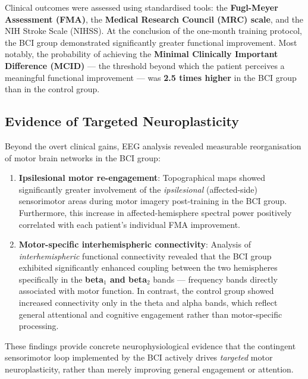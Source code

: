 \documentclass[10pt, letterpaper]{report}
\begin{document}
Clinical outcomes were assessed using standardised tools: the \textbf{Fugl-Meyer
Assessment (FMA)}, the \textbf{Medical Research Council (MRC) scale}, and the NIH
Stroke Scale (NIHSS). At the conclusion of the one-month training protocol, the BCI group
demonstrated significantly greater functional improvement. Most notably, the probability of
achieving the \textbf{Minimal Clinically Important Difference (MCID)} — the threshold
beyond which the patient perceives a meaningful functional improvement — was
\textbf{2.5 times higher} in the BCI group than in the control group.

\subsection{Evidence of Targeted Neuroplasticity}

Beyond the overt clinical gains, EEG analysis revealed measurable reorganisation of
motor brain networks in the BCI group:

\begin{enumerate}
  \item \textbf{Ipsilesional motor re-engagement}: Topographical maps showed
  significantly greater involvement of the \emph{ipsilesional} (affected-side)
  sensorimotor areas during motor imagery post-training in the BCI group. Furthermore,
  this increase in affected-hemisphere spectral power positively correlated with each
  patient's individual FMA improvement.

  \item \textbf{Motor-specific interhemispheric connectivity}: Analysis of
  \emph{interhemispheric} functional connectivity revealed that the BCI group exhibited
  significantly enhanced coupling between the two hemispheres specifically in the
  \textbf{beta$_1$ and beta$_2$} bands — frequency bands directly associated with motor
  function. In contrast, the control group showed increased connectivity only in the
  theta and alpha bands, which reflect general attentional and cognitive engagement rather
  than motor-specific processing.
\end{enumerate}

These findings provide concrete neurophysiological evidence that the contingent
sensorimotor loop implemented by the BCI actively drives \emph{targeted} motor
neuroplasticity, rather than merely improving general engagement or attention.
\end{document}

